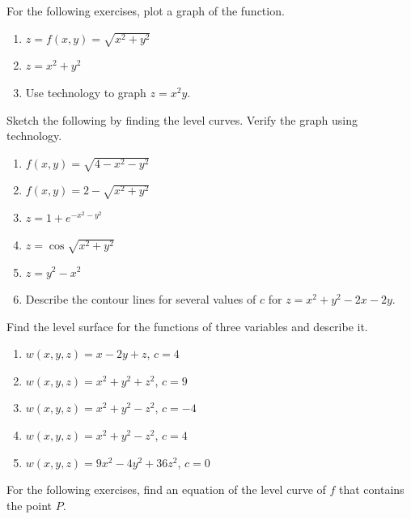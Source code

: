 \documentclass{exercises}
\begin{document}
For the following exercises, plot a graph of the function.

\begin{enumerate}[resume]
\item $z=f(x,y)=\sqrt{x^{2}+y^{2}}$
\item $z=x^{2}+y^{2}$
\item Use technology to graph $z=x^{2}y$.
\end{enumerate}

Sketch the following by finding the level curves. Verify the graph using technology.

\begin{enumerate}[resume]
\item $f(x,y)=\sqrt{4-x^{2}-y^{2}}$
\item $f(x,y)=2-\sqrt{x^{2}+y^{2}}$
\item $z=1+e^{-x^{2}-y^{2}}$
\item $z=\cos \sqrt{x^{2}+y^{2}}$
\item $z=y^{2}-x^{2}$
\item Describe the contour lines for several values of $c$ for $z=x^{2}+y^{2}-2x-2y$.
\end{enumerate}

Find the level surface for the functions of three variables and describe it.

\begin{enumerate}[resume]
\item $w(x,y,z)=x-2y+z$, $c=4$
\item $w(x,y,z)=x^{2}+y^{2}+z^{2}$, $c=9$
\item $w(x,y,z)=x^{2}+y^{2}-z^{2}$, $c=-4$
\item $w(x,y,z)=x^{2}+y^{2}-z^{2}$, $c=4$
\item $w(x,y,z)=9x^{2}-4y^{2}+36z^{2}$, $c=0$
\end{enumerate}

For the following exercises, find an equation of the level curve of $f$ that contains the point $P$.
\end{document}

